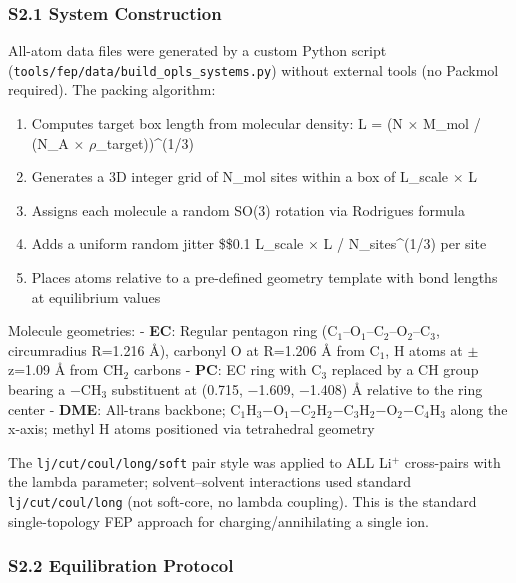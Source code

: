 \documentclass[
  11pt,
]{article}
\providecommand{\tightlist}{%
  \setlength{\itemsep}{0pt}\setlength{\parskip}{0pt}}
\begin{document}
\subsubsection{S2.1 System Construction}\label{s2.1-system-construction}

All-atom data files were generated by a custom Python script
(\texttt{tools/fep/data/build\_opls\_systems.py}) without external tools
(no Packmol required). The packing algorithm:

\begin{enumerate}
\def\labelenumi{\arabic{enumi}.}
\tightlist
\item
  Computes target box length from molecular density: L = (N \(\times\)
  M\_mol / (N\_A \(\times\) \(\rho\)\_target))\^{}(1/3)
\item
  Generates a 3D integer grid of N\_mol sites within a box of L\_scale
  \(\times\) L
\item
  Assigns each molecule a random SO(3) rotation via Rodrigues formula
\item
  Adds a uniform random jitter \$\pm\$0.1 L\_scale \(\times\) L /
  N\_sites\^{}(1/3) per site
\item
  Places atoms relative to a pre-defined geometry template with bond
  lengths at equilibrium values
\end{enumerate}

Molecule geometries: - \textbf{EC}: Regular pentagon ring
(C\(_{1}\)--O\(_{1}\)--C\(_{2}\)--O\(_{2}\)--C\(_{3}\), circumradius
R=1.216 \AA{}), carbonyl O at R=1.206 \AA{} from C\(_{1}\), H atoms at
\(\pm\)z=1.09 \AA{} from CH\(_{2}\) carbons - \textbf{PC}: EC ring with
C\(_{3}\) replaced by a CH group bearing a −CH\(_{3}\) substituent at
(0.715, −1.609, −1.408) \AA{} relative to the ring center -
\textbf{DME}: All-trans backbone;
C\(_{1}\)H\(_{3}\)−O\(_{1}\)−C\(_{2}\)H\(_{2}\)−C\(_{3}\)H\(_{2}\)−O\(_{2}\)−C\(_{4}\)H\(_{3}\)
along the x-axis; methyl H atoms positioned via tetrahedral geometry

The \texttt{lj/cut/coul/long/soft} pair style was applied to ALL
Li\(^{+}\) cross-pairs with the lambda parameter; solvent--solvent
interactions used standard \texttt{lj/cut/coul/long} (not soft-core, no
lambda coupling). This is the standard single-topology FEP approach for
charging/annihilating a single ion.

\subsubsection{S2.2 Equilibration
Protocol}\label{s2.2-equilibration-protocol}
\end{document}
